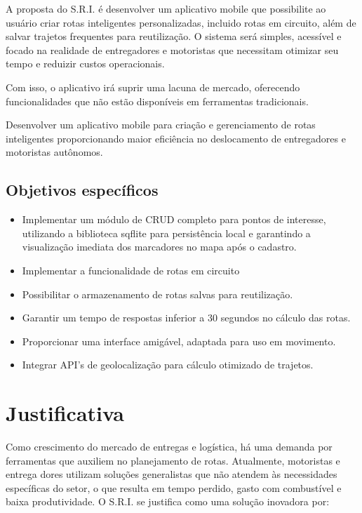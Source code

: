 A proposta do S.R.I. é desenvolver um aplicativo mobile que possibilite ao usuário criar rotas inteligentes personalizadas, incluido rotas em circuito, além de salvar trajetos frequentes para reutilização. O sistema será simples, acessível e focado na realidade de entregadores e motoristas que necessitam otimizar seu tempo e reduizir custos operacionais.

Com isso, o aplicativo irá suprir uma lacuna de mercado, oferecendo funcionalidades que não estão disponíveis em ferramentas tradicionais.

Desenvolver um aplicativo mobile para criação e gerenciamento de rotas inteligentes proporcionando maior eficiência no deslocamento de entregadores e motoristas autônomos.


\subsection{Objetivos específicos}

\begin{itemize}
    \item Implementar um módulo de CRUD completo para pontos de interesse, utilizando a biblioteca sqflite para persistência local e garantindo a visualização imediata dos marcadores no mapa após o cadastro.
    \item Implementar a funcionalidade de rotas em circuito
    \item Possibilitar o armazenamento de rotas salvas para reutilização.
    \item Garantir um tempo de respostas inferior a 30 segundos no cálculo das rotas.
    \item Proporcionar uma interface amigável, adaptada para uso em movimento.
    \item Integrar API’s de geolocalização para cálculo otimizado de trajetos.
\end{itemize}

\section{Justificativa}

Como crescimento do mercado de entregas e logística, há uma demanda por ferramentas que auxiliem no planejamento de rotas. Atualmente, motoristas e entrega dores utilizam soluções generalistas que não atendem às necessidades específicas do setor, o que resulta em tempo perdido, gasto com combustível e baixa produtividade.
O S.R.I. se justifica como uma solução inovadora por:

